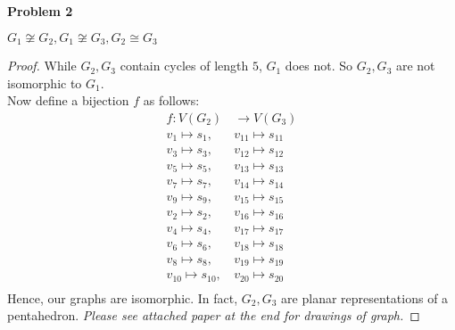 \documentclass{article}
\newenvironment{claim}[2][Claim]{\begin{trivlist}
		\item[\hskip \labelsep {\bfseries #1}\hskip \labelsep {\bfseries #2}]}{\end{trivlist}}
\begin{document}
\noindent\textbf{Problem 2}
\begin{claim}{}
$G_1 \not \cong G_2, G_1 \not \cong G_3, G_2 \cong G_3$
\end{claim}
\begin{proof}
While $G_2, G_3$ contain cycles of length $5$, $G_1$ does not. So $G_2, G_3$ are not isomorphic to $G_1$. \\
Now define a bijection $f$ as follows:
\begin{align*}
f : V(G_2) &\to V(G_3)\\
v_{1}  \mapsto s_{1},    \,  & v_{11} \mapsto s_{11}  \\
v_{3}  \mapsto s_{3},    \,  & v_{12} \mapsto s_{12}  \\
v_{5}  \mapsto s_{5},    \,  & v_{13} \mapsto s_{13}  \\
v_{7}  \mapsto s_{7},    \,  & v_{14} \mapsto s_{14}  \\
v_{9}  \mapsto s_{9},    \,  & v_{15} \mapsto s_{15}  \\
v_{2}  \mapsto s_{2},    \,  & v_{16} \mapsto s_{16}  \\
v_{4}  \mapsto s_{4},    \,  & v_{17} \mapsto s_{17}  \\
v_{6}  \mapsto s_{6},    \,  & v_{18} \mapsto s_{18}  \\
v_{8}  \mapsto s_{8},    \,  & v_{19} \mapsto s_{19}  \\
v_{10} \mapsto s_{10},   \,  & v_{20} \mapsto s_{20}  \\
\end{align*}
Hence, our graphs are isomorphic. In fact, $G_2, G_3$ are planar representations of a pentahedron.
\textit{Please see attached paper at the end for drawings of graph.}
\end{proof}
%
\newpage
\end{document}
